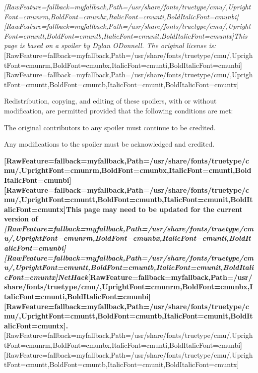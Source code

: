\begin{myenumerate}
\end{myenumerate}


{\itshape \allowbreak{}\setmainfont{cmunti.ttf}[RawFeature={fallback=myfallback},Path=/usr/share/fonts/truetype/cmu/,UprightFont=cmunrm,BoldFont=cmunbx,ItalicFont=cmunti,BoldItalicFont=cmunbi]\setmonofont{cmunti.ttf}[RawFeature={fallback=myfallback},Path=/usr/share/fonts/truetype/cmu/,UprightFont=cmuntt,BoldFont=cmuntb,ItalicFont=cmunit,BoldItalicFont=cmuntx]\itshape This page is based on a spoiler by Dylan O\textquotesingle{}Donnell\footnotemark[151]. The original license is:}\allowbreak{}\setmainfont{cmunrm.ttf}[RawFeature={fallback=myfallback},Path=/usr/share/fonts/truetype/cmu/,UprightFont=cmunrm,BoldFont=cmunbx,ItalicFont=cmunti,BoldItalicFont=cmunbi]\setmonofont{cmunrm.ttf}[RawFeature={fallback=myfallback},Path=/usr/share/fonts/truetype/cmu/,UprightFont=cmuntt,BoldFont=cmuntb,ItalicFont=cmunit,BoldItalicFont=cmuntx]


Redistribution, copying, and editing of these spoilers, with or without modification, are permitted provided that the following conditions are met:




\begin{myenumerate}\item{}The original contributors to any spoiler must continue to be credited.
\item{}Any modifications to the spoiler must be acknowledged and credited.
\end{myenumerate}




{\bfseries \allowbreak{}\setmainfont{cmunbx.ttf}[RawFeature={fallback=myfallback},Path=/usr/share/fonts/truetype/cmu/,UprightFont=cmunrm,BoldFont=cmunbx,ItalicFont=cmunti,BoldItalicFont=cmunbi]\setmonofont{cmunbx.ttf}[RawFeature={fallback=myfallback},Path=/usr/share/fonts/truetype/cmu/,UprightFont=cmuntt,BoldFont=cmuntb,ItalicFont=cmunit,BoldItalicFont=cmuntx]\bfseries This page may need to be updated for the current version\footnotemark[152] of {\itshape \allowbreak{}\setmainfont{cmunbi.ttf}[RawFeature={fallback=myfallback},Path=/usr/share/fonts/truetype/cmu/,UprightFont=cmunrm,BoldFont=cmunbx,ItalicFont=cmunti,BoldItalicFont=cmunbi]\setmonofont{cmunbi.ttf}[RawFeature={fallback=myfallback},Path=/usr/share/fonts/truetype/cmu/,UprightFont=cmuntt,BoldFont=cmuntb,ItalicFont=cmunit,BoldItalicFont=cmuntx]\bfseries \itshape NetHack}\allowbreak{}\setmainfont{cmunbx.ttf}[RawFeature={fallback=myfallback},Path=/usr/share/fonts/truetype/cmu/,UprightFont=cmunrm,BoldFont=cmunbx,ItalicFont=cmunti,BoldItalicFont=cmunbi]\setmonofont{cmunbx.ttf}[RawFeature={fallback=myfallback},Path=/usr/share/fonts/truetype/cmu/,UprightFont=cmuntt,BoldFont=cmuntb,ItalicFont=cmunit,BoldItalicFont=cmuntx]\bfseries .}\allowbreak{}\setmainfont{cmunrm.ttf}[RawFeature={fallback=myfallback},Path=/usr/share/fonts/truetype/cmu/,UprightFont=cmunrm,BoldFont=cmunbx,ItalicFont=cmunti,BoldItalicFont=cmunbi]\setmonofont{cmunrm.ttf}[RawFeature={fallback=myfallback},Path=/usr/share/fonts/truetype/cmu/,UprightFont=cmuntt,BoldFont=cmuntb,ItalicFont=cmunit,BoldItalicFont=cmuntx]


